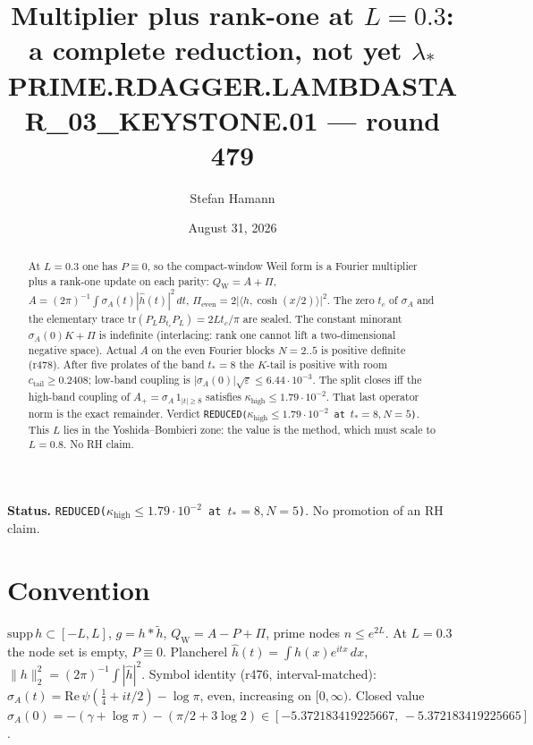 \documentclass[11pt]{article}
\title{\bfseries Multiplier plus rank-one at $L=0.3$:\\[2mm]
a complete reduction, not yet $\lambda_*$\\[2mm]
\large PRIME.RDAGGER.LAMBDASTAR\_03\_KEYSTONE.01 --- round 479}
\author{Stefan Hamann}
\date{August 31, 2026}
\theoremstyle{remark}
\newcommand{\QW}{Q_{\mathrm W}}
\begin{document}
\maketitle

\begin{abstract}\noindent
At $L=0.3$ one has $P\equiv0$, so the compact-window Weil form
is a Fourier multiplier plus a rank-one update on each parity:
$\QW=A+\Pi$,
$A=(2\pi)^{-1}\int\sigma_A(t)|\hat h(t)|^2\,dt$,
$\Pi_{\mathrm{even}}=2\bigl|\langle h,\cosh(x/2)\rangle\bigr|^2$.
The zero $t_c$ of $\sigma_A$ and the elementary trace
$\mathrm{tr}(P_LB_{t_c}P_L)=2Lt_c/\pi$ are sealed.
The constant minorant $\sigma_A(0)K+\Pi$ is indefinite
(interlacing: rank one cannot lift a two-dimensional negative
space).  Actual $A$ on the even Fourier blocks $N=2..5$ is
positive definite (r478).  After five prolates of the band
$t_*=8$ the $K$-tail is positive with room
$c_{\mathrm{tail}}\ge0.2408$; low-band coupling is
$|\sigma_A(0)|\sqrt{\varepsilon}\le6.44\cdot10^{-3}$.
The split closes iff the high-band coupling of
$A_+=\sigma_A\,1_{|t|\ge8}$ satisfies
$\kappa_{\mathrm{high}}\le1.79\cdot10^{-2}$.
That last operator norm is the exact remainder.
Verdict \texttt{REDUCED($\kappa_{\mathrm{high}}\le1.79\cdot10^{-2}$ at $t_*=8,N=5$)}.
This $L$ lies in the Yoshida--Bombieri zone: the value is the
method, which must scale to $L=0.8$.  No RH claim.
\end{abstract}

\medskip\noindent
\textbf{Status.}\enspace
\texttt{REDUCED($\kappa_{\mathrm{high}}\le1.79\cdot10^{-2}$ at $t_*=8,N=5$)}.
No promotion of an RH claim.

\begin{center}
\end{center}

\section{Convention}

$\mathrm{supp}\,h\subset[-L,L]$, $g=h*\widetilde h$,
$\QW=A-P+\Pi$, prime nodes $n\le e^{2L}$.
At $L=0.3$ the node set is empty, $P\equiv0$.
Plancherel $\hat h(t)=\int h(x)e^{itx}\,dx$,
$\|h\|_2^2=(2\pi)^{-1}\int|\hat h|^2$.
Symbol identity (r476, interval-matched):
$\sigma_A(t)=\mathrm{Re}\,\psi(\tfrac14+it/2)-\log\pi$,
even, increasing on $[0,\infty)$.
Closed value
$\sigma_A(0)=-(\gamma+\log\pi)-(\pi/2+3\log2)
\in[-5.372183419225667,\,-5.372183419225665]$.
\end{document}
